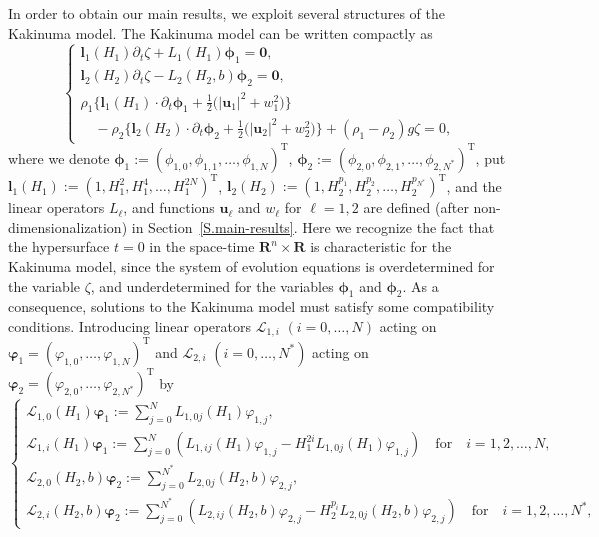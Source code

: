 \documentclass[11pt,leqno]{article}
\numberwithin{equation}{section}
\numberwithin{figure}{section}
\begin{document}
In order to obtain our main results, we exploit several structures of the Kakinuma model.
The Kakinuma model can be written compactly as 
%
\begin{equation}\label{intro:Kakinuma-compact} 
	\begin{cases}
		\displaystyle
		{\bm l}_1(H_1)\partial_t\zeta + L_1(H_1){\bm \phi}_1 = {\bm 0}, \\
		\displaystyle
		{\bm l}_2(H_2)\partial_t\zeta - L_2(H_2,b){\bm \phi}_2 = {\bm 0}, \\
		{\rho}_1\bigl\{ {\bm l}_1(H_1) \cdot \partial_t{\bm \phi}_1 
		+ \frac12\bigl( |{\bm u}_1|^2 +  w_1^2 \bigr) \bigr\} \\
		\quad
		- {\rho}_2\bigl\{ {\bm l}_2(H_2) \cdot \partial_t{\bm \phi}_2 
		+ \frac12\bigl( |{\bm u}_2|^2 + w_2^2 \bigr) \bigr\} 
		+ (\rho_1-\rho_2)g\zeta = 0,
	\end{cases}
\end{equation}
%
where we denote ${\bm \phi}_1 := (\phi_{1,0},\phi_{1,1},\ldots,\phi_{1,N})^\mathrm{T}$, 
${\bm \phi}_2 := (\phi_{2,0},\phi_{2,1},\ldots,\phi_{2,N^*})^\mathrm{T}$, 
put ${\bm l}_1(H_1) := (1,H_1^2,H_1^4,\ldots,H_1^{2N})^\mathrm{T}$, ${\bm l}_2(H_2) := (1,H_2^{p_1},H_2^{p_2},\ldots,H_2^{p_{N^*}})^\mathrm{T}$,
and the linear operators $L_\ell$, and functions ${\bm u}_\ell$ and $w_\ell$ for $\ell=1,2$ are defined (after non-dimensionalization) in Section~\ref{S.main-results}. Here we recognize the fact that the hypersurface $t=0$ in the space-time $\mathbf{R}^n\times\mathbf{R}$ is characteristic for 
the Kakinuma model, since the system of evolution equations is overdetermined for the variable $\zeta$, and underdetermined for the variables ${\bm \phi}_1$ and ${\bm \phi}_2$. As a consequence, solutions to the Kakinuma model must satisfy some compatibility conditions. Introducing linear operators $\mathcal{L}_{1,i}$ $(i=0,\ldots,N)$
acting on ${\bm \varphi}_1 = (\varphi_{1,0},\ldots,\varphi_{1,N})^\mathrm{T}$ and 
$\mathcal{L}_{2,i} $ $(i=0,\ldots,N^*)$ 
acting on ${\bm \varphi}_2 = (\varphi_{2,0},\ldots,\varphi_{2,N^*})^\mathrm{T}$ by 
%
\[
	\begin{cases}
		\displaystyle
		\mathcal{L}_{1,0}(H_1) {\bm \varphi}_1 
		:= \sum_{j=0}^{N} L_{1,0j}(H_1)\varphi_{1,j}, \\
		\displaystyle
		\mathcal{L}_{1,i}(H_1) {\bm \varphi}_1
		:= \sum_{j=0}^N ( L_{1,ij}(H_1)\varphi_{1,j} - H_1^{2i}L_{1,0j}(H_1)\varphi_{1,j} )
		\quad\mbox{for}\quad i=1,2,\ldots,N, \\
		\displaystyle
		\mathcal{L}_{2,0}(H_2,b) {\bm \varphi}_2 
		:= \sum_{j=0}^{N^*} L_{2,0j}(H_2,b)\varphi_{2,j}, \\
		\displaystyle
		\mathcal{L}_{2,i}(H_2,b) {\bm \varphi}_2
		:= \sum_{j=0}^{N^*} ( L_{2,ij}(H_2,b)\varphi_{2,j} - H_2^{p_i}L_{2,0j}(H_2,b)\varphi_{2,j} )
		\quad\mbox{for}\quad i=1,2,\ldots,N^*, 
	\end{cases}
\]
\end{document}
